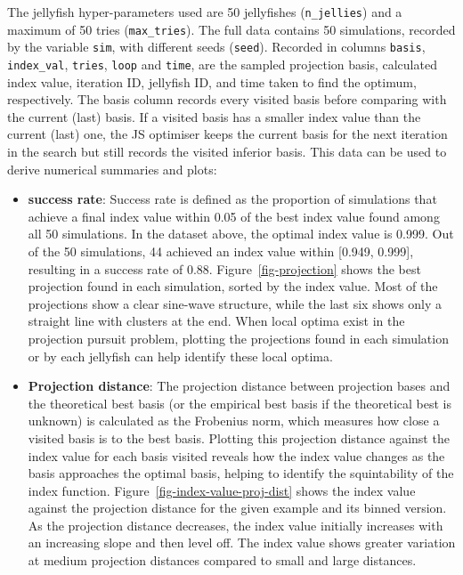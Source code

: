 \documentclass[
  number,
  preprint,
  3p]{elsarticle}
\begin{document}
The jellyfish hyper-parameters used are 50 jellyfishes
(\texttt{n\_jellies}) and a maximum of 50 tries (\texttt{max\_tries}).
The full data contains 50 simulations, recorded by the variable
\texttt{sim}, with different seeds (\texttt{seed}). Recorded in columns
\texttt{basis}, \texttt{index\_val}, \texttt{tries}, \texttt{loop} and
\texttt{time}, are the sampled projection basis, calculated index value,
iteration ID, jellyfish ID, and time taken to find the optimum,
respectively. The basis column records every visited basis before
comparing with the current (last) basis. If a visited basis has a
smaller index value than the current (last) one, the JS optimiser keeps
the current basis for the next iteration in the search but still records
the visited inferior basis. This data can be used to derive numerical
summaries and plots:

\begin{itemize}
\item
  \textbf{success rate}: Success rate is defined as the proportion of
  simulations that achieve a final index value within 0.05 of the best
  index value found among all 50 simulations. In the dataset above, the
  optimal index value is 0.999. Out of the 50 simulations, 44 achieved
  an index value within {[}0.949, 0.999{]}, resulting in a success rate
  of 0.88. Figure~\ref{fig-projection} shows the best projection found
  in each simulation, sorted by the index value. Most of the projections
  show a clear sine-wave structure, while the last six shows only a
  straight line with clusters at the end. When local optima exist in the
  projection pursuit problem, plotting the projections found in each
  simulation or by each jellyfish can help identify these local optima.
\item
  \textbf{Projection distance}: The projection distance between
  projection bases and the theoretical best basis (or the empirical best
  basis if the theoretical best is unknown) is calculated as the
  Frobenius norm, which measures how close a visited basis is to the
  best basis. Plotting this projection distance against the index value
  for each basis visited reveals how the index value changes as the
  basis approaches the optimal basis, helping to identify the
  squintability of the index function.
  Figure~\ref{fig-index-value-proj-dist} shows the index value against
  the projection distance for the given example and its binned version.
  As the projection distance decreases, the index value initially
  increases with an increasing slope and then level off. The index value
  shows greater variation at medium projection distances compared to
  small and large distances.
\end{itemize}
\end{document}
